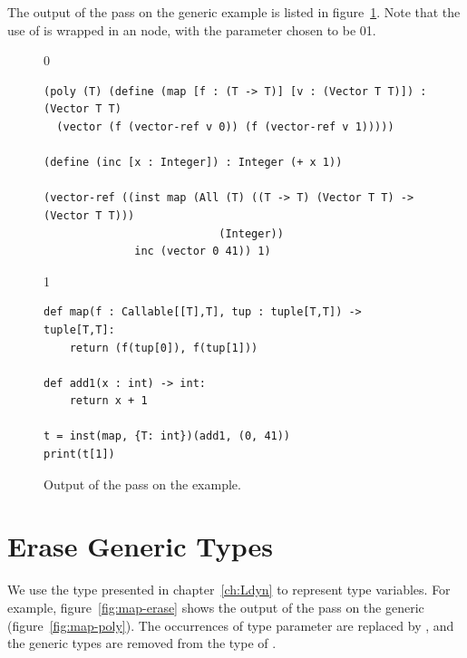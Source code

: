 \documentclass[7x10]{TimesAPriori_MIT}%
\def\racketEd{0}
\def\pythonEd{1}
\providecommand{\BookEdition}{1}
\let\edition\BookEdition
\newcommand{\racket}[1]{{\if\edition\racketEd{#1}\fi}}
\newcommand{\pythonColor}[0]{}
\newcommand{\python}[1]{{\if\edition\pythonEd\pythonColor #1\fi}}
\numberwithin{theorem}{chapter}
\numberwithin{definition}{chapter}
\numberwithin{equation}{chapter}
\begin{document}
The output of the  pass on the generic 
example is listed in figure~\ref{fig:map-resolve}. Note that the use
of  is wrapped in an  node, with the parameter
 chosen to be \racket{}\python{}.

\begin{figure}[tbp]
\begin{tcolorbox}[colback=white]  
{\if\edition\racketEd    
\begin{lstlisting}
(poly (T) (define (map [f : (T -> T)] [v : (Vector T T)]) : (Vector T T)
  (vector (f (vector-ref v 0)) (f (vector-ref v 1)))))

(define (inc [x : Integer]) : Integer (+ x 1))

(vector-ref ((inst map (All (T) ((T -> T) (Vector T T) -> (Vector T T)))
                           (Integer))
              inc (vector 0 41)) 1)
\end{lstlisting}
\fi}
{\if\edition\pythonEd\pythonColor
\begin{lstlisting}
def map(f : Callable[[T],T], tup : tuple[T,T]) -> tuple[T,T]:
    return (f(tup[0]), f(tup[1]))

def add1(x : int) -> int:
    return x + 1

t = inst(map, {T: int})(add1, (0, 41))
print(t[1])
\end{lstlisting}
\fi}
\end{tcolorbox}
\caption{Output of the  pass on the  example.}
\label{fig:map-resolve}
\end{figure}

\section{Erase Generic Types}
\label{sec:erase_types}

We use the \CANYTY{} type presented in chapter~\ref{ch:Ldyn} to
represent type variables. For example, figure~\ref{fig:map-erase}
shows the output of the  pass on the generic
 (figure~\ref{fig:map-poly}). The occurrences of
type parameter  are replaced by \CANYTY{}, and the generic
 types are removed from the type of . 
\end{document}
